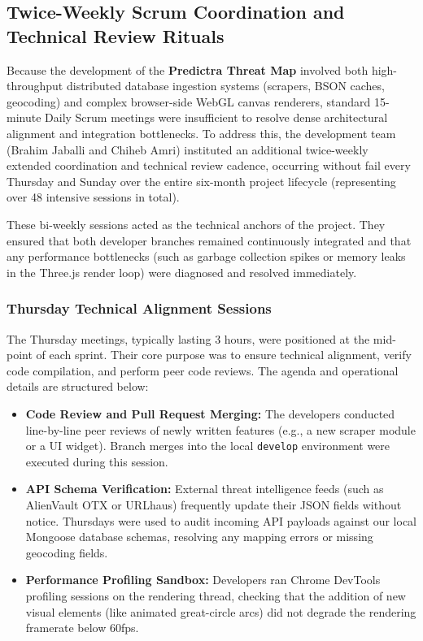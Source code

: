 \subsection{Twice-Weekly Scrum Coordination and Technical Review Rituals}
\label{subsec:biweekly_meetings}
Because the development of the \textbf{Predictra Threat Map} involved both high-throughput distributed database ingestion systems (scrapers, BSON caches, geocoding) and complex browser-side WebGL canvas renderers, standard 15-minute Daily Scrum meetings were insufficient to resolve dense architectural alignment and integration bottlenecks. To address this, the development team (Brahim Jaballi and Chiheb Amri) instituted an additional twice-weekly extended coordination and technical review cadence, occurring without fail every Thursday and Sunday over the entire six-month project lifecycle (representing over 48 intensive sessions in total).

These bi-weekly sessions acted as the technical anchors of the project. They ensured that both developer branches remained continuously integrated and that any performance bottlenecks (such as garbage collection spikes or memory leaks in the Three.js render loop) were diagnosed and resolved immediately.

\subsubsection{Thursday Technical Alignment Sessions}
The Thursday meetings, typically lasting 3 hours, were positioned at the mid-point of each sprint. Their core purpose was to ensure technical alignment, verify code compilation, and perform peer code reviews. The agenda and operational details are structured below:
\begin{itemize}
    \item \textbf{Code Review and Pull Request Merging:} The developers conducted line-by-line peer reviews of newly written features (e.g., a new scraper module or a UI widget). Branch merges into the local \texttt{develop} environment were executed during this session.
    \item \textbf{API Schema Verification:} External threat intelligence feeds (such as AlienVault OTX or URLhaus) frequently update their JSON fields without notice. Thursdays were used to audit incoming API payloads against our local Mongoose database schemas, resolving any mapping errors or missing geocoding fields.
    \item \textbf{Performance Profiling Sandbox:} Developers ran Chrome DevTools profiling sessions on the rendering thread, checking that the addition of new visual elements (like animated great-circle arcs) did not degrade the rendering framerate below 60fps.
\end{itemize}

